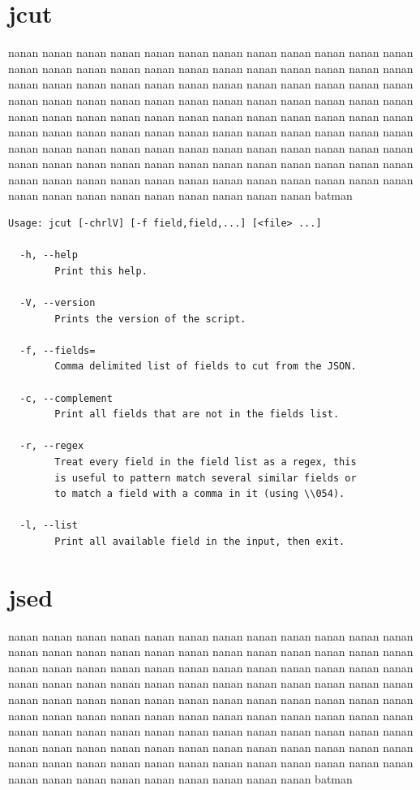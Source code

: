 \documentclass[11pt,a4paper,draft]{report}
\begin{document}
\section{jcut}

nanan nanan nanan nanan nanan nanan nanan nanan nanan nanan nanan nanan nanan
nanan nanan nanan nanan nanan nanan nanan nanan nanan nanan nanan nanan nanan
nanan nanan nanan nanan nanan nanan nanan nanan nanan nanan nanan nanan nanan
nanan nanan nanan nanan nanan nanan nanan nanan nanan nanan nanan nanan nanan
nanan nanan nanan nanan nanan nanan nanan nanan nanan nanan nanan nanan nanan
nanan nanan nanan nanan nanan nanan nanan nanan nanan nanan nanan nanan nanan
nanan nanan nanan nanan nanan nanan nanan nanan nanan nanan nanan nanan nanan
nanan nanan nanan nanan nanan nanan nanan nanan nanan nanan nanan nanan nanan
nanan nanan nanan nanan nanan nanan nanan nanan nanan nanan nanan nanan nanan
batman

{\small
\begin{Verbatim}[samepage=true]
Usage: jcut [-chrlV] [-f field,field,...] [<file> ...]

  -h, --help
        Print this help.

  -V, --version
        Prints the version of the script.

  -f, --fields=
        Comma delimited list of fields to cut from the JSON.

  -c, --complement
        Print all fields that are not in the fields list.

  -r, --regex
        Treat every field in the field list as a regex, this
        is useful to pattern match several similar fields or
        to match a field with a comma in it (using \\054).

  -l, --list
        Print all available field in the input, then exit.
\end{Verbatim}
}

\section{jsed}

nanan nanan nanan nanan nanan nanan nanan nanan nanan nanan nanan nanan nanan
nanan nanan nanan nanan nanan nanan nanan nanan nanan nanan nanan nanan nanan
nanan nanan nanan nanan nanan nanan nanan nanan nanan nanan nanan nanan nanan
nanan nanan nanan nanan nanan nanan nanan nanan nanan nanan nanan nanan nanan
nanan nanan nanan nanan nanan nanan nanan nanan nanan nanan nanan nanan nanan
nanan nanan nanan nanan nanan nanan nanan nanan nanan nanan nanan nanan nanan
nanan nanan nanan nanan nanan nanan nanan nanan nanan nanan nanan nanan nanan
nanan nanan nanan nanan nanan nanan nanan nanan nanan nanan nanan nanan nanan
nanan nanan nanan nanan nanan nanan nanan nanan nanan nanan nanan nanan nanan
batman
\end{document}
